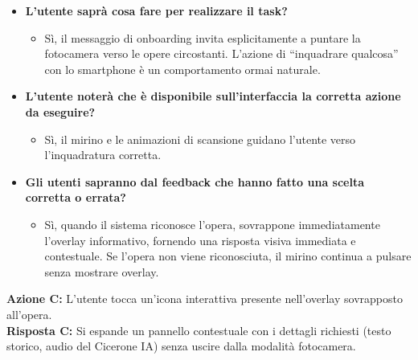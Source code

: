 \begin{itemize}[nosep, leftmargin=1.6em]
    \item \textbf{L'utente saprà cosa fare per realizzare il task?}
    \begin{itemize}[nosep, leftmargin=1.6em]
        \item Sì, il messaggio di onboarding invita esplicitamente a puntare la fotocamera verso le opere circostanti. L'azione di ``inquadrare qualcosa'' con lo smartphone è un comportamento ormai naturale.
    \end{itemize}
    \item \textbf{L'utente noterà che è disponibile sull'interfaccia la corretta azione da eseguire?}
    \begin{itemize}[nosep, leftmargin=1.6em]
        \item Sì, il mirino e le animazioni di scansione guidano l'utente verso l'inquadratura corretta.
    \end{itemize}
    \item \textbf{Gli utenti sapranno dal feedback che hanno fatto una scelta corretta o errata?}
    \begin{itemize}[nosep, leftmargin=1.6em]
        \item Sì, quando il sistema riconosce l'opera, sovrappone immediatamente l'overlay informativo, fornendo una risposta visiva immediata e contestuale. Se l'opera non viene riconosciuta, il mirino continua a pulsare senza mostrare overlay.
    \end{itemize}
\end{itemize}

\vspace{0.3cm}
\noindent\textbf{Azione C:} L'utente tocca un'icona interattiva presente nell'overlay sovrapposto all'opera.\\
\textbf{Risposta C:} Si espande un pannello contestuale con i dettagli richiesti (testo storico, audio del Cicerone IA) senza uscire dalla modalità fotocamera.

